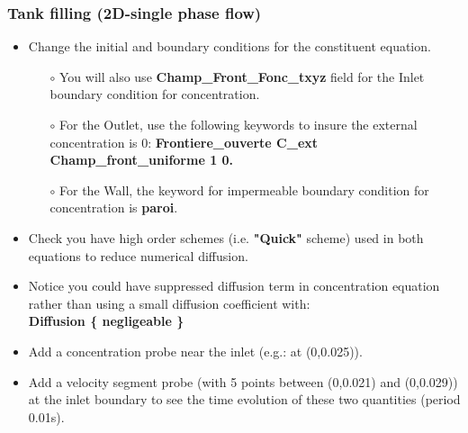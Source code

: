 \documentclass[10pt]{beamer}
\begin{document}
\begin{frame}
\frametitle{Tank filling (2D-single phase flow)}
\begin{block}{}

\begin{itemize}
\item Change the initial and boundary conditions for the constituent equation. 
    \begin{itemize}
    \item [$\circ$] You will also use \textbf{Champ\_Front\_Fonc\_txyz} field for the Inlet boundary condition for concentration.
    \item [$\circ$] For the Outlet, use the following keywords to insure the external concentration is 0:
                    \textbf{Frontiere\_ouverte C\_ext Champ\_front\_uniforme 1 0.} \\
    \item [$\circ$] For the Wall, the keyword for impermeable boundary condition for concentration is \textbf{paroi}.
    \end{itemize}
\item Check you have high order schemes (i.e. \textbf{"Quick"} scheme) used in both equations to reduce numerical diffusion. 
\item Notice you could have suppressed diffusion term in concentration equation rather than using a small diffusion coefficient with:\\
\textbf{Diffusion \{ negligeable \}}
\item Add a concentration probe near the inlet (e.g.: at (0,0.025)).
\item Add a velocity segment probe (with 5 points between (0,0.021) and (0,0.029)) at the inlet boundary to see the time evolution of these two quantities (period 0.01s).
\end{itemize}

\end{block}
\end{frame}
\end{document}
